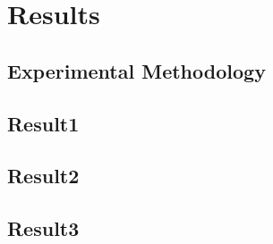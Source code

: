 \section{Results}
\label{sec:Results}

\subsection{Experimental Methodology}
\label{sub:Experimental}

\subsection{Result1}
\label{sub:Result1}

\subsection{Result2}
\label{sub:Result2}

\subsection{Result3}
\label{sub:Result3}
